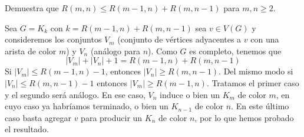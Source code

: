\documentclass[twoside]{article}
\begin{document}
\begin{ejercicio}{2.9}
Demuestra que $R(m, n) ≤ R(m − 1, n) + R(m, n − 1)$ para $m, n ≥ 2$.
\end{ejercicio}
\begin{solucion}
Sea $G=K_k$ con $k=R(m − 1, n) + R(m, n − 1)$ sea $v\in V(G)$ y consideremos los conjuntos $V_m$ (conjunto de vértices adyacentes a $v$ con una arista de color $m$) y $V_n$ (análogo para $n$). Como $G$ es completo, tenemos que 
\[
|V_m|+|V_n|+1=R(m-1,n)+R(m,n-1)
\] 
Si $|V_m|\leq R(m-1,n)-1$, entonces $|V_n|\geq R(m,n-1)$. Del mismo modo si $|V_n|\leq R(m,n-1)-1$ entonces $|V_m|\geq R(m-1,n)$. Tratamos el primer caso y el segundo será análogo. En ese caso, $V_n$ induce o bien un $K_m$ de color $m$, en cuyo caso ya habríamos terminado, o bien un $K_{n-1}$ de color $n$. En este último caso basta agregar $v$ para producir un $K_n$ de color $n$, por lo que hemos probado el resultado. 
\end{solucion}
\end{document}
